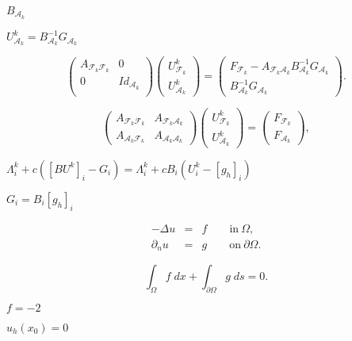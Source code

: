 \documentclass{article}
\begin{document}
$B_{\mathcal{A}_k}$
\pagebreak

$U^k_{\mathcal{A}_k}=B^{-1}_{\mathcal{A}_k}G_{\mathcal{A}_k}$
\pagebreak

\begin{equation*} \begin{pmatrix} A_{\mathcal{F}_k\mathcal{F}_k} & 0\\ 0 & Id_{\mathcal{A}_k} \\ \end{pmatrix} \begin{pmatrix} U^k_{\mathcal{F}_k}\\ U^k_{\mathcal{A}_k} \end{pmatrix} = \begin{pmatrix} F_{\mathcal{F}_k} - A_{\mathcal{F}_k\mathcal{A}_k}B^{-1}_{\mathcal{A}_k}G_{\mathcal{A}_k} \\ B_{\mathcal{A}_k}^{-1}G_{\mathcal{A}_k} \end{pmatrix}. \end{equation*}
\pagebreak

\begin{equation*} \begin{pmatrix} A_{\mathcal{F}_k\mathcal{F}_k} & A_{\mathcal{F}_k\mathcal{A}_k} \\ A_{\mathcal{A}_k\mathcal{F}_k} & A_{\mathcal{A}_k\mathcal{A}_k} \end{pmatrix} \begin{pmatrix} U^k_{\mathcal{F}_k}\\ U^k_{\mathcal{A}_k} \end{pmatrix} = \begin{pmatrix} F_{\mathcal{F}_k}\\ F_{\mathcal{A}_k} \end{pmatrix}, \end{equation*}
\pagebreak

$\Lambda^k_i + c([BU^k]_i - G_i) = \Lambda^k_i + cB_i(U^k_i - [g_h]_i)$
\pagebreak

$G_i = B_i[g_h]_i$
\pagebreak

\begin{eqnarray*} -\Delta u &=& f \qquad \mathrm{in}\ \Omega, \\ \partial_n u &=& g \qquad \mathrm{on}\ \partial\Omega. \end{eqnarray*}
\pagebreak

\[ \int_\Omega f\; dx + \int_{\partial\Omega} g\; ds = 0. \]
\pagebreak

$f=-2$
\pagebreak

$u_h(x_0)=0$
\pagebreak
\end{document}
